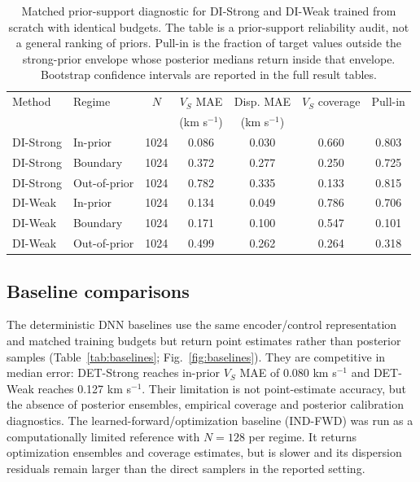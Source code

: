 \documentclass[referee]{gji}
\begin{document}
\begin{table}
\caption{Matched prior-support diagnostic for DI-Strong and DI-Weak trained from scratch with identical budgets. The table is a prior-support reliability audit, not a general ranking of priors. Pull-in is the fraction of target values outside the strong-prior envelope whose posterior medians return inside that envelope. Bootstrap confidence intervals are reported in the full result tables.}
\label{tab:priorboundary}
\centering
\begin{tabular}{@{}llccccc@{}}
\toprule
Method & Regime & $N$ & $V_S$ MAE & Disp. MAE & $V_S$ coverage & Pull-in \\
 & & & (km s$^{-1}$) & (km s$^{-1}$) & & \\
\midrule
DI-Strong & In-prior & 1024 & 0.086 & 0.030 & 0.660 & 0.803 \\
DI-Strong & Boundary & 1024 & 0.372 & 0.277 & 0.250 & 0.725 \\
DI-Strong & Out-of-prior & 1024 & 0.782 & 0.335 & 0.133 & 0.815 \\
DI-Weak & In-prior & 1024 & 0.134 & 0.049 & 0.786 & 0.706 \\
DI-Weak & Boundary & 1024 & 0.171 & 0.100 & 0.547 & 0.101 \\
DI-Weak & Out-of-prior & 1024 & 0.499 & 0.262 & 0.264 & 0.318 \\
\bottomrule
\end{tabular}
\end{table}

\subsection{Baseline comparisons}

The deterministic DNN baselines use the same encoder/control representation and matched training budgets but return point estimates rather than posterior samples (Table~\ref{tab:baselines}; Fig.~\ref{fig:baselines}). They are competitive in median error: DET-Strong reaches in-prior $V_S$ MAE of 0.080 km s$^{-1}$ and DET-Weak reaches 0.127 km s$^{-1}$. Their limitation is not point-estimate accuracy, but the absence of posterior ensembles, empirical coverage and posterior calibration diagnostics. The learned-forward/optimization baseline (IND-FWD) was run as a computationally limited reference with $N=128$ per regime. It returns optimization ensembles and coverage estimates, but is slower and its dispersion residuals remain larger than the direct samplers in the reported setting.
\end{document}
